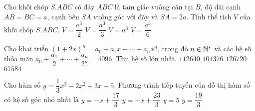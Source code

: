 \begin{ex}%
Cho khối chóp $S.ABC$ có đáy $ABC$ là tam giác vuông cân tại $B$, độ dài cạnh $AB = BC = a$, cạnh bên $SA$ vuông góc với đáy và $SA = 2a$. Tính thể tích $V$ của khối chóp $S.ABC$. 
	\choice
	{$V = \dfrac{a^3}{2}$}
	{\True $V = \dfrac{a^3}{3}$}
	{$V = a^3$}
	{$V = \dfrac{a^3}{6}$}

\end{ex}

\begin{ex}%
Cho khai triển $(1 + 2x)^n = a_0 + a_1x + \cdots + a_nx^n$, trong đó $n \in \Bbb{N}^*$ và các hệ số thỏa mãn $a_0 + \dfrac{a_1}{2} + \cdots + \dfrac{a_n}{2^n} = 4096$. Tìm hệ số lớn nhất. 
	\choice
	{$112640$}
	{$101376$}
	{\True $126720$}
	{$67584$}
\end{ex}

\begin{ex}%
Cho hàm số $y = \dfrac{1}{3}x^3 - 2x^2 + 3x + 5$. Phương trình tiếp tuyến của đồ thị hàm số có hệ số góc nhỏ nhất là 	
	\choice
	{$y = - x + \dfrac{17}{3}$}
	{\True $y = - x + \dfrac{23}{3}$}
	{$y = 5$}
	{$y = \dfrac{19}{3}$}
\end{ex}


